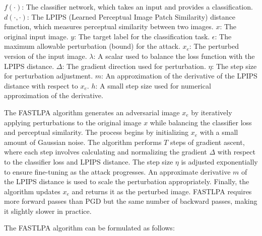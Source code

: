 
$f(\cdot)$: The classifier network, which takes an input and provides a classification.
$d(\cdot, \cdot)$: The LPIPS (Learned Perceptual Image Patch Similarity) distance function, which measures perceptual similarity between two images.
$x$: The original input image.
$y$: The target label for the classification task.
$\epsilon$: The maximum allowable perturbation (bound) for the attack.
$x_e$: The perturbed version of the input image.
$\lambda$: A scalar used to balance the loss function with the LPIPS distance.
$\Delta$: The gradient direction used for perturbation.
$\eta$: The step size for perturbation adjustment.
$m$: An approximation of the derivative of the LPIPS distance with respect to $x_e$.
$h$: A small step size used for numerical approximation of the derivative.

The FASTLPA algorithm generates an adversarial image $x_e$ by iteratively applying perturbations to the original image $x$ while balancing the classifier loss and perceptual similarity. The process begins by initializing $x_e$ with a small amount of Gaussian noise. The algorithm performs $T$ steps of gradient ascent, where each step involves calculating and normalizing the gradient $\Delta$ with respect to the classifier loss and LPIPS distance. The step size $\eta$ is adjusted exponentially to ensure fine-tuning as the attack progresses. An approximate derivative $m$ of the LPIPS distance is used to scale the perturbation appropriately. Finally, the algorithm updates $x_e$ and returns it as the perturbed image. FASTLPA requires more forward passes than PGD but the same number of backward passes, making it slightly slower in practice.

The FASTLPA algorithm can be formulated as follows:

